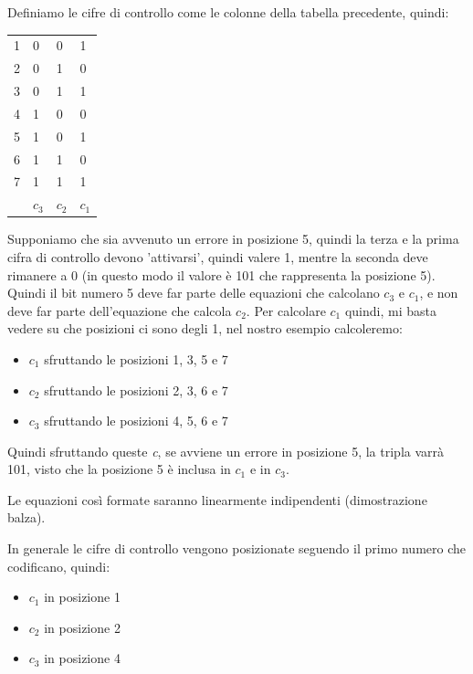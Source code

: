 Definiamo le cifre di controllo come le colonne della tabella precedente, quindi:

\begin{table}[h]
	\centering
	\begin{tabular}{l|lll}
		\hline
		1   & 0 & 0 & 1            \\
		2   & 0 & 1 & 0            \\
		3   & 0 & 1 & 1            \\
		4   & 1 & 0 & 0            \\
		5   & 1 & 0 & 1            \\
		6   & 1 & 1 & 0            \\
		7   & 1 & 1 & 1        \\
		\hline
		& $c_3$ & $c_2$ & $c_1$    
	\end{tabular}
\end{table}

Supponiamo che sia avvenuto un errore in posizione 5, quindi la terza e la prima cifra di controllo devono 'attivarsi', quindi valere 1, mentre la seconda deve rimanere a 0 (in questo modo il valore è 101 che rappresenta la posizione 5).\\
Quindi il bit numero 5 deve far parte delle equazioni che calcolano $c_3$ e $c_1$, e non deve far parte dell'equazione che calcola $c_2$.
Per calcolare $c_1$ quindi, mi basta vedere su che posizioni ci sono degli 1, nel nostro esempio calcoleremo:
\begin{itemize}
	\item $c_1$ sfruttando le posizioni 1, 3, 5 e 7
	\item $c_2$ sfruttando le posizioni 2, 3, 6 e 7
	\item $c_3$ sfruttando le posizioni 4, 5, 6 e 7
\end{itemize}

Quindi sfruttando queste \textit{c}, se avviene un errore in posizione 5, la tripla varrà 101, visto che la posizione 5 è inclusa in $c_1$ e in $c_3$.

Le equazioni così formate saranno linearmente indipendenti (dimostrazione balza).

In generale le cifre di controllo vengono posizionate seguendo il primo numero che codificano, quindi:

\begin{itemize}
	\item $c_1$ in posizione 1
	\item $c_2$ in posizione 2
	\item $c_3$ in posizione 4
\end{itemize}

